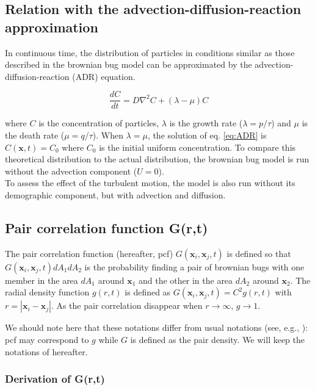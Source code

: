 \subsection*{Relation with the advection-diffusion-reaction approximation} 
In continuous time, the distribution of particles in conditions similar as those described in the brownian bug model can be approximated by the advection-diffusion-reaction (ADR) equation. 

\begin{equation}
\frac{dC}{dt}=D\nabla^2 C+(\lambda-\mu)C
\label{eq:ADR}
\end{equation}

where $C$ is the concentration of particles, $\lambda$ is the growth rate ($\lambda=p/\tau$)  and $\mu$ is the death rate ($\mu=q/\tau$). When $\lambda=\mu$, the solution of eq. \ref{eq:ADR} is $C(\boldsymbol{x},t)=C_0$ where $C_0$ is the initial uniform concentration. To compare this theoretical distribution to the actual distribution, the brownian bug model is run without the advection component ($U=0$).\\

To assess the effect of the turbulent motion, the model is also run without its demographic component, but with advection and diffusion.

\subsection*{Pair correlation function G(r,t)}

The pair correlation function (hereafter, pcf) $G(\boldsymbol{x}_i,\boldsymbol{x}_j,t)$ is defined so that $G(\boldsymbol{x}_i,\boldsymbol{x}_j,t)dA_1dA_2$ is the probability finding a pair of brownian bugs with one member in the area $dA_1$ around $\boldsymbol{x}_1$ and the other in the area $dA_2$ around $\boldsymbol{x}_2$. The radial density function $g(r,t)$ is defined as $G(\boldsymbol{x}_i,\boldsymbol{x}_j,t)=C^2g(r,t)$ with $r=|\boldsymbol{x}_i-\boldsymbol{x}_j|$. As the pair correlation disappear when $r\rightarrow\infty$, $g\rightarrow 1$.  

We should note here that these notations differ from usual notations (see, e.g., \cite{illian2008statistical}): pcf may correspond to $g$ while $G$ is defined as the pair density. We will keep the notations of \cite{young_reproductive_2001} hereafter. 

\subsubsection*{Derivation of G(r,t)}

